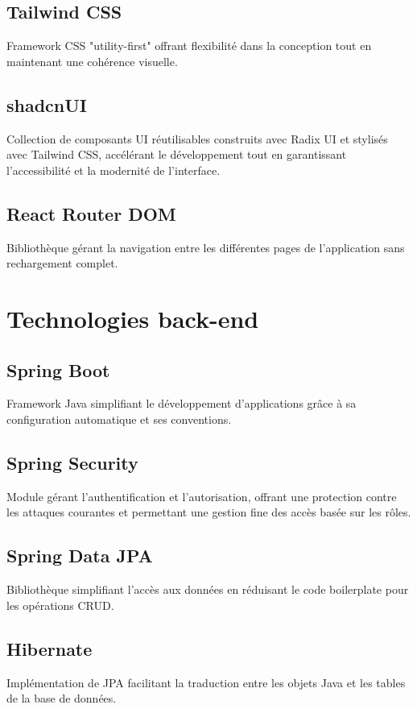 \subsection{Tailwind CSS}
\noindent Framework CSS "utility-first" offrant flexibilité dans la conception tout en maintenant une cohérence visuelle.

\subsection{shadcnUI}
\noindent Collection de composants UI réutilisables construits avec Radix UI et stylisés avec Tailwind CSS, accélérant le développement tout en garantissant l'accessibilité et la modernité de l'interface.

\subsection{React Router DOM}
\noindent Bibliothèque gérant la navigation entre les différentes pages de l'application sans rechargement complet.

\section{Technologies back-end}

\subsection{Spring Boot}
\noindent Framework Java simplifiant le développement d'applications grâce à sa configuration automatique et ses conventions.

\subsection{Spring Security}
\noindent Module gérant l'authentification et l'autorisation, offrant une protection contre les attaques courantes et permettant une gestion fine des accès basée sur les rôles.

\subsection{Spring Data JPA}
\noindent Bibliothèque simplifiant l'accès aux données en réduisant le code boilerplate pour les opérations CRUD.

\subsection{Hibernate}
\noindent Implémentation de JPA facilitant la traduction entre les objets Java et les tables de la base de données.


